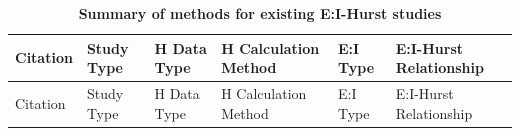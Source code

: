 \documentclass[
true
]{sn-jnl}
\begin{document}
\begin{longtable}[]{@{}
  >{\raggedright\arraybackslash}p{}
  >{\raggedright\arraybackslash}p{}
  >{\raggedright\arraybackslash}p{}
  >{\raggedright\arraybackslash}p{}
  >{\raggedright\arraybackslash}p{}
  >{\raggedright\arraybackslash}p{}@{}}
\caption{\textbf{Summary of methods for existing E:I-Hurst
studies}}\label{tbl-lit}\tabularnewline
\toprule\noalign{}
\begin{minipage}[b]{\linewidth}\raggedright
Citation
\end{minipage} & \begin{minipage}[b]{\linewidth}\raggedright
Study Type
\end{minipage} & \begin{minipage}[b]{\linewidth}\raggedright
H Data Type
\end{minipage} & \begin{minipage}[b]{\linewidth}\raggedright
H Calculation Method
\end{minipage} & \begin{minipage}[b]{\linewidth}\raggedright
E:I Type
\end{minipage} & \begin{minipage}[b]{\linewidth}\raggedright
E:I-Hurst Relationship
\end{minipage} \\
\midrule\noalign{}
\endfirsthead
\toprule\noalign{}
\begin{minipage}[b]{\linewidth}\raggedright
Citation
\end{minipage} & \begin{minipage}[b]{\linewidth}\raggedright
Study Type
\end{minipage} & \begin{minipage}[b]{\linewidth}\raggedright
H Data Type
\end{minipage} & \begin{minipage}[b]{\linewidth}\raggedright
H Calculation Method
\end{minipage} & \begin{minipage}[b]{\linewidth}\raggedright
E:I Type
\end{minipage} & \begin{minipage}[b]{\linewidth}\raggedright
E:I-Hurst Relationship
\end{minipage} \\

\end{longtable}
\end{document}
